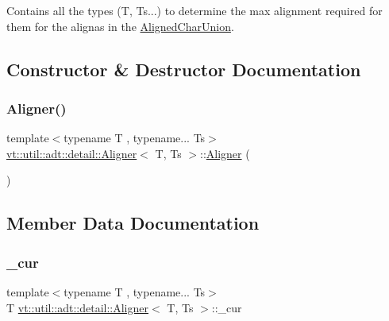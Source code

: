 Contains all the types (T, Ts...) to determine the max alignment required for them for the alignas in the {\ttfamily \hyperlink{structvt_1_1util_1_1adt_1_1_aligned_char_union}{Aligned\+Char\+Union}}. 



\subsection{Constructor \& Destructor Documentation}
\mbox{\label{structvt_1_1util_1_1adt_1_1detail_1_1_aligner_a998732c9b376b2a0020425ba72d5d5ae}} 
\subsubsection{\texorpdfstring{Aligner()}{Aligner()}}
{\footnotesize\ttfamily template$<$typename T , typename... Ts$>$ \\
\hyperlink{structvt_1_1util_1_1adt_1_1detail_1_1_aligner}{vt\+::util\+::adt\+::detail\+::\+Aligner}$<$ T, Ts $>$\+::\hyperlink{structvt_1_1util_1_1adt_1_1detail_1_1_aligner}{Aligner} (\begin{DoxyParamCaption}{ }\end{DoxyParamCaption})\hspace{0.3cm}{\ttfamily [delete]}}



\subsection{Member Data Documentation}
\mbox{\label{structvt_1_1util_1_1adt_1_1detail_1_1_aligner_aafdf38bb15e0136c6c529108f28c2dee}} 
\subsubsection{\texorpdfstring{\+\_\+cur}{\_cur}}
{\footnotesize\ttfamily template$<$typename T , typename... Ts$>$ \\
T \hyperlink{structvt_1_1util_1_1adt_1_1detail_1_1_aligner}{vt\+::util\+::adt\+::detail\+::\+Aligner}$<$ T, Ts $>$\+::\+\_\+cur}

